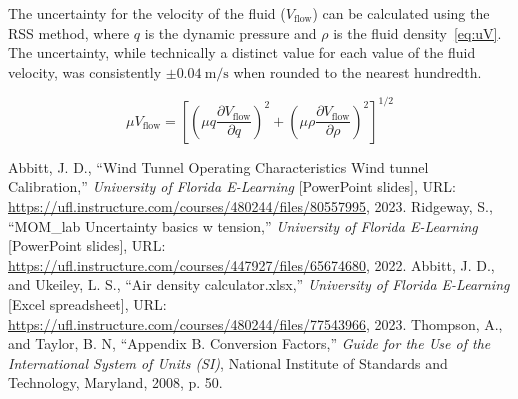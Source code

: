 \documentclass[journal,letterpaper]{IEEEtran}
\begin{document}
The uncertainty for the velocity of the fluid ($V_\text{flow}$) can be calculated using the RSS method, where $q$ is the dynamic pressure and $\rho$ is the fluid density~\eqref{eq:uV}.
The uncertainty, while technically a distinct value for each value of the fluid velocity, was consistently $\pm \qty{0.04}{\m\per\s}$ when rounded to the nearest hundredth.

\begin{equation} \label{eq:uV}
    \mu V_\text{flow} = \left[\left(\mu q \frac{\partial V_\text{flow}}{\partial q}\right)^2 + \left(\mu \rho \frac{\partial V_\text{flow}}{\partial \rho}\right)^2\right]^{1/2}
\end{equation}

\begin{thebibliography}{9}
     Abbitt, J. D., ``Wind Tunnel Operating Characteristics
    Wind tunnel Calibration,'' \textit{University of Florida E-Learning} [PowerPoint slides], URL: \url{https://ufl.instructure.com/courses/480244/files/80557995}, 2023.
     Ridgeway, S., ``MOM\_lab Uncertainty basics w tension,'' \textit{University of Florida E-Learning} [PowerPoint slides], URL: \url{https://ufl.instructure.com/courses/447927/files/65674680}, 2022.
     Abbitt, J. D., and Ukeiley, L. S., ``Air density calculator.xlsx,'' \textit{University of Florida E-Learning} [Excel spreadsheet], URL: \url{https://ufl.instructure.com/courses/480244/files/77543966}, 2023.
     Thompson, A., and Taylor, B. N, ``Appendix B. Conversion Factors,'' \textit{Guide for the Use of the International System of Units (SI)}, National Institute of Standards and Technology, Maryland, 2008, p. 50.
\end{thebibliography}
\end{document}
